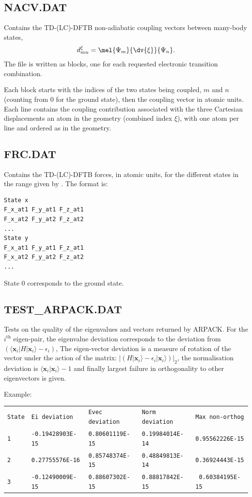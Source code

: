 \subsection{NACV.DAT}
\label{subsec:nacv.dat}

Contains the TD-(LC)-DFTB non-adiabatic coupling vectors between
many-body states, $$d^\xi_{mn} = \mel{\Psi_m}{\dv{\xi}}{\Psi_n}.$$
The file is written as blocks, one for each requested electronic
transition combination.

Each block starts with the indices of the two states being coupled,
$m$ and $n$ (counting from 0 for the ground state), then the coupling
vector in atomic units. Each line contains the coupling contribution
associated with the three Cartesian displacements an atom in the
geometry (combined index $\xi$), with one atom per line and ordered as
in the geometry.

\subsection{FRC.DAT}

Contains the TD-(LC)-DFTB forces, in atomic units, for the different states in the range
given by . The format is:\\
\begin{verbatim}
State x
F_x_at1 F_y_at1 F_z_at1
F_x_at2 F_y_at2 F_z_at2
...
State y
F_x_at1 F_y_at1 F_z_at1
F_x_at2 F_y_at2 F_z_at2
...
\end{verbatim}
State 0 corresponds to the ground state.

\subsection{TEST\_ARPACK.DAT}

Tests on the quality of the eigenvalues and vectors returned by ARPACK. For the
$i^\mathrm{th}$ eigen-pair, the eigenvalue deviation corresponds to the
deviation from $\left( \langle \mathbf{x}_i | H | \mathbf{x}_i\rangle -
\epsilon_i \right)$, The eigen-vector deviation is a measure of rotation of the
vector under the action of the matrix: $\left| \left( H | \mathbf{x}_i\rangle -
\epsilon_i | \mathbf{x}_i\rangle \right) \right|_2$, the normalisation deviation
is $\langle \mathbf{x}_i | \mathbf{x}_i\rangle - 1$ and finally largest failure
in orthogonality to other eigenvectors is given.

Example:\\
\begin{tabular}{lllll}
{\tt State} & {\tt Ei deviation} & {\tt Evec deviation} & {\tt Norm deviation} &
{\tt Max non-orthog}\\ {\tt 1} & {\tt -0.19428903E-15} & {\tt 0.80601119E-15} &
{\tt 0.19984014E-14} & {\tt 0.95562226E-15}\\ {\tt 2} & {\tt 0.27755576E-16} &
{\tt 0.85748374E-15} & {\tt 0.48849813E-14} & {\tt 0.36924443E-15}\\ {\tt 3} &
{\tt -0.12490009E-15} & {\tt 0.88607302E-15} & {\tt 0.88817842E-15} & {\tt
  0.60384195E-15}\\
\end{tabular}

